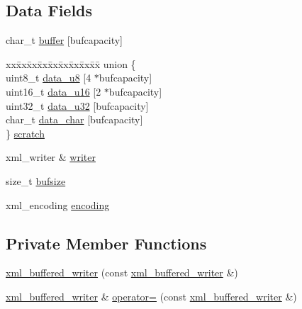 \subsection*{Data Fields}
\begin{DoxyCompactItemize}
\item 
char\_\-t \hyperlink{classxml__buffered__writer_a84c87765fbdf444d981ffb0f67899dd4}{buffer} \mbox{[}bufcapacity\mbox{]}
\item 
\begin{tabbing}
xx\=xx\=xx\=xx\=xx\=xx\=xx\=xx\=xx\=\kill
union \{\\
\>uint8\_t \hyperlink{classxml__buffered__writer_ac672c70ba0597cf94d35c352ac563891}{data\_u8} \mbox{[}4 $\ast$bufcapacity\mbox{]}\\
\>uint16\_t \hyperlink{classxml__buffered__writer_aa969d3724efe221a68927947e3a5196d}{data\_u16} \mbox{[}2 $\ast$bufcapacity\mbox{]}\\
\>uint32\_t \hyperlink{classxml__buffered__writer_afa54826d8227c4ee661e1a9cc1e1acf2}{data\_u32} \mbox{[}bufcapacity\mbox{]}\\
\>char\_t \hyperlink{classxml__buffered__writer_a6f21e839a1c66901995c8aae5cc9ad7b}{data\_char} \mbox{[}bufcapacity\mbox{]}\\
\} \hyperlink{classxml__buffered__writer_a74fd3d695095835afa0f7671ac33037c}{scratch}\\

\end{tabbing}\item 
xml\_\-writer \& \hyperlink{classxml__buffered__writer_a37cdd45f867937e1978565f5a0fa318b}{writer}
\item 
size\_\-t \hyperlink{classxml__buffered__writer_a6bad6a93035d796939d84bee30e74ce7}{bufsize}
\item 
xml\_\-encoding \hyperlink{classxml__buffered__writer_ab810a7286598172e1549561b285f08fb}{encoding}
\end{DoxyCompactItemize}
\subsection*{Private Member Functions}
\begin{DoxyCompactItemize}
\item 
\hyperlink{classxml__buffered__writer_a6ab927cae021733a4b2e9e7cbbb79c13}{xml\_\-buffered\_\-writer} (const \hyperlink{classxml__buffered__writer}{xml\_\-buffered\_\-writer} \&)
\item 
\hyperlink{classxml__buffered__writer}{xml\_\-buffered\_\-writer} \& \hyperlink{classxml__buffered__writer_a0aab8cdf0db6269840a0b16319bdb985}{operator=} (const \hyperlink{classxml__buffered__writer}{xml\_\-buffered\_\-writer} \&)
\end{DoxyCompactItemize}


